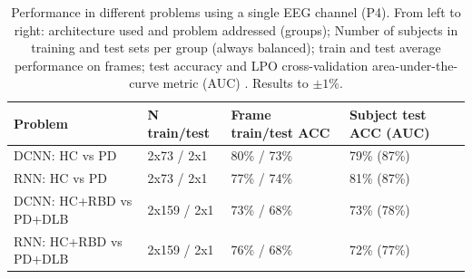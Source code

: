 \documentclass[review]{elsarticle}
\begin{document}
\begin{table}
\caption{Performance in different problems using a single EEG channel (P4). From left to right: architecture used and problem addressed (groups); Number of subjects in training and test sets per group (always balanced); train and test average performance on frames; test accuracy and LPO cross-validation area-under-the-curve metric (AUC) \label{table} \cite{Airola2010}. Results to  $\pm 1$\%. }
{\footnotesize
\begin{tabular}{ p{4.5cm} p{2.6cm} p{2.6cm} p{2.6cm} }
	\hline 
	\rule[-1ex]{0pt}{2.5ex} \bf Problem 		& \bf N \newline train/test & \bf Frame \newline train/test \newline ACC	 & \bf Subject test \newline ACC (AUC) \\ 
	\hline 	\hline 
	\rule[-1ex]{0pt}{2.5ex} DCNN: HC vs PD & 2x73 / 2x1 & 80\% / 73\% & 79\% (87\%) \\ 
	\hline 
	\rule[-1ex]{0pt}{2.5ex} RNN: HC vs PD & 2x73 / 2x1 &77\% / 74\% & 81\% (87\%) \\ 
	\hline 
	\rule[-1ex]{0pt}{2.5ex} DCNN: HC+RBD vs PD+DLB & 2x159 / 2x1 &73\% / 68\% & 73\% (78\%) \\ 
	\hline %
	\rule[-1ex]{0pt}{2.5ex} RNN: HC+RBD vs PD+DLB & 2x159 / 2x1 & 76\% / 68\% & 72\% (77\%) \\ 
	\hline 
\end{tabular} 
}

\end{table}
\end{document}
